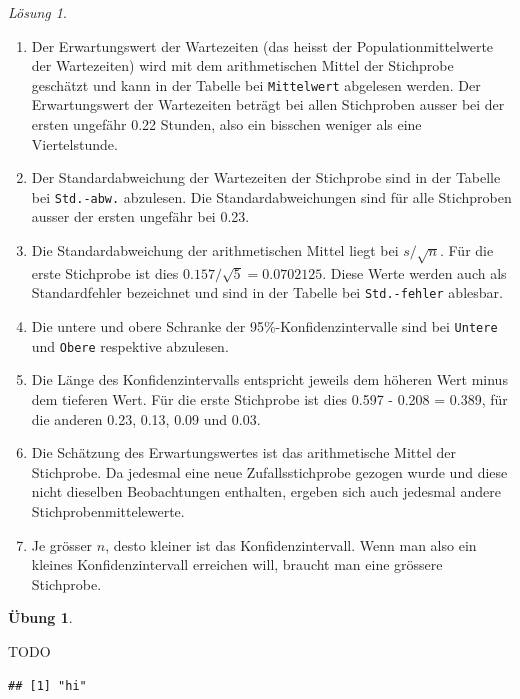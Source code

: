 \documentclass[
]{book}
\providecommand{\tightlist}{%
  \setlength{\itemsep}{0pt}\setlength{\parskip}{0pt}}
\theoremstyle{definition}
\theoremstyle{definition}
\theoremstyle{definition}
\newtheorem{exercise}{Übung}[chapter]
\theoremstyle{definition}
\theoremstyle{remark}
\newtheorem*{solution}{Lösung}
\begin{document}
\begin{solution}
\begin{enumerate}
\def\labelenumi{\alph{enumi}.}
\tightlist
\item
  Der Erwartungswert der Wartezeiten (das heisst der Populationmittelwerte der Wartezeiten) wird mit dem arithmetischen Mittel der Stichprobe geschätzt und kann in der Tabelle bei \texttt{Mittelwert} abgelesen werden. Der Erwartungswert der Wartezeiten beträgt bei allen Stichproben ausser bei der ersten ungefähr 0.22 Stunden, also ein bisschen weniger als eine Viertelstunde.
\item
  Der Standardabweichung der Wartezeiten der Stichprobe sind in der Tabelle bei \texttt{Std.-abw.} abzulesen. Die Standardabweichungen sind für alle Stichproben ausser der ersten ungefähr bei 0.23.
\item
  Die Standardabweichung der arithmetischen Mittel liegt bei \(s/\sqrt{n}\). Für die erste Stichprobe ist dies \(0.157 / \sqrt{5} = 0.0702125\). Diese Werte werden auch als Standardfehler bezeichnet und sind in der Tabelle bei \texttt{Std.-fehler} ablesbar.
\item
  Die untere und obere Schranke der 95\%-Konfidenzintervalle sind bei \texttt{Untere} und \texttt{Obere} respektive abzulesen.\\
\item
  Die Länge des Konfidenzintervalls entspricht jeweils dem höheren Wert minus dem tieferen Wert. Für die erste Stichprobe ist dies 0.597 - 0.208 = 0.389, für die anderen 0.23, 0.13, 0.09 und 0.03.
\item
  Die Schätzung des Erwartungswertes ist das arithmetische Mittel der Stichprobe. Da jedesmal eine neue Zufallsstichprobe gezogen wurde und diese nicht dieselben Beobachtungen enthalten, ergeben sich auch jedesmal andere Stichprobenmittelewerte.
\item
  Je grösser \(n\), desto kleiner ist das Konfidenzintervall. Wenn man also ein kleines Konfidenzintervall erreichen will, braucht man eine grössere Stichprobe.
\end{enumerate}

\end{solution}

\begin{exercise}
\protect\hypertarget{exr:ki-mean-s-vary}{}\label{exr:ki-mean-s-vary}

TODO

\begin{verbatim}
## [1] "hi"
\end{verbatim}

\end{exercise}
\end{document}
